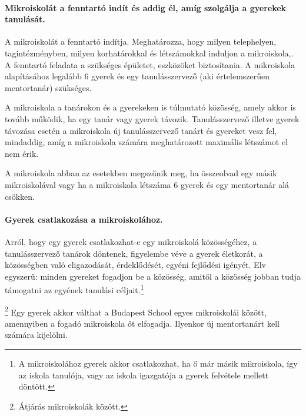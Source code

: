 \paragraph{Mikroiskolát a fenntartó indít és addig él, amíg szolgálja a
      gyerekek tanulását.}
A mikroiskolát a fenntartó indítja. Meghatározza, hogy milyen telephelyen,
tagintézményben, milyen korhatárokkal és létszámokkal
induljon a mikroiskola,. A fenntartó feladata a szükséges épületet, eszközöket
biztosítania. A
mikroiskola alapításához legalább 6 gyerek és egy tanulásszervező (aki
értelemszerűen mentortanár)
szükséges.

A mikroiskola a tanárokon és a gyerekeken is túlmutató közösség, amely akkor is
tovább működik, ha egy tanár vagy gyerek távozik. Tanulásszervező illetve
gyerek távozása esetén a mikroiskola  új tanulásszervező tanárt és gyereket
vesz fel, mindaddig, amíg a mikroiskola számára meghatározott maximális
létszámot el nem érik.

A mikroiskola abban az esetekben megszűnik meg, ha összeolvad egy másik
mikroiskolával vagy
ha a mikroiskola létszáma 6 gyerek és egy mentortanár alá csökken.

\paragraph{Gyerek csatlakozása a mikroiskolához.}
Arról, hogy egy gyerek csatlakozhat-e egy mikroiskolá közösségéhez, a
tanulásszervező
tanárok döntenek, figyelembe véve a gyerek életkorát, a közösségben való
eligazodását, érdeklődését, egyéni fejlődési igényét. Elv egyszerű: minden
gyereket fogadjon be a közösség, amitől a közösség jobban tudja támogatni az
egyének tanulási céljait.\footnote{A mikroiskolához gyerek akkor csatlakozhat,
      ha ő már másik mikroiskola, így az iskola tanulója, vagy az iskola
      igazgatója a
      gyerek felvétele mellett döntött.}

\footnote{Átjárás mikroiskolák között.}
Egy gyerek akkor válthat a Budapest School egyes mikroiskolái között,
amennyiben a fogadó mikroiskola őt elfogadja. Ilyenkor új mentortanárt kell
számára kijelölni.
